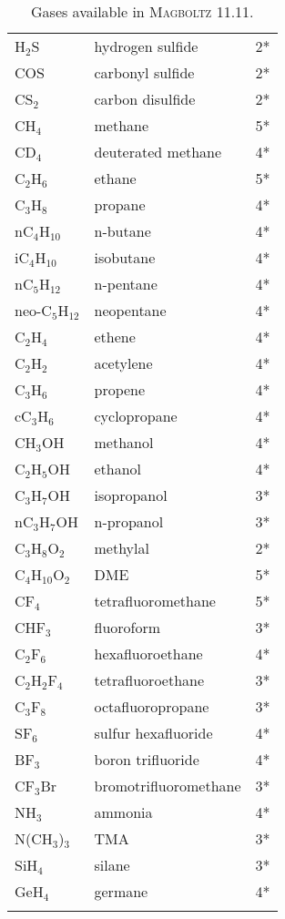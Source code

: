 \begin{appendix}
\begin{longtable}{l l l}
  H\(_{2}\)S & hydrogen sulfide & 2* \\
  COS        & carbonyl sulfide & 2* \\
  CS\(_{2}\) & carbon disulfide & 2* \\
  \midrule
  CH\(_{4}\)           & methane   & 5* \\
  CD\(_{4}\)           & deuterated methane & 4* \\
  C\(_{2}\)H\(_{6}\)   & ethane    & 5* \\
  C\(_{3}\)H\(_{8}\)   & propane   & 4* \\
  nC\(_{4}\)H\(_{10}\) & n-butane  & 4* \\
  iC\(_{4}\)H\(_{10}\) & isobutane & 4* \\ 
  nC\(_{5}\)H\(_{12}\) & n-pentane & 4* \\  
  neo-C\(_{5}\)H\(_{12}\) & neopentane & 4* \\
  C\(_{2}\)H\(_{4}\)   & ethene    & 4* \\
  C\(_{2}\)H\(_{2}\)   & acetylene & 4* \\
  C\(_{3}\)H\(_{6}\)   & propene   & 4* \\
  cC\(_{3}\)H\(_{6}\)   & cyclopropane & 4* \\
  \midrule
  CH\(_{3}\)OH         & methanol        & 4* \\
  C\(_{2}\)H\(_{5}\)OH & ethanol         & 4* \\
  C\(_{3}\)H\(_{7}\)OH & isopropanol     & 3* \\
  nC\(_{3}\)H\(_{7}\)OH & n-propanol     & 3* \\
  C\(_{3}\)H\(_{8}\)O\(_{2}\)  & methylal & 2* \\
  C\(_{4}\)H\(_{10}\)O\(_{2}\) & DME      & 5* \\
  \midrule
  CF\(_{4}\)           & tetrafluoromethane & 5* \\
  CHF\(_{3}\)          & fluoroform         & 3* \\
  C\(_{2}\)F\(_{6}\)   & hexafluoroethane   & 4* \\
  C\(_{2}\)H\(_{2}\)F\(_{4}\) & tetrafluoroethane & 3* \\
  C\(_{3}\)F\(_{8}\)   & octafluoropropane  & 3* \\
  SF\(_{6}\)           & sulfur hexafluoride  & 4* \\
  BF\(_{3}\)           & boron trifluoride    & 4* \\ 
  CF\(_{3}\)Br         & bromotrifluoromethane & 3* \\
  \midrule
  NH\(_{3}\)            & ammonia  & 4* \\
  N(CH\(_{3}\))\(_{3}\) & TMA      & 3* \\
  SiH\(_{4}\)           & silane   & 3* \\
  GeH\(_{4}\)           & germane  & 4* \\
  \bottomrule
  \caption{Gases available in \textsc{Magboltz} 11.11.} 
  \label{Tab:GasesMagboltz11}
\end{longtable}


\end{appendix}


